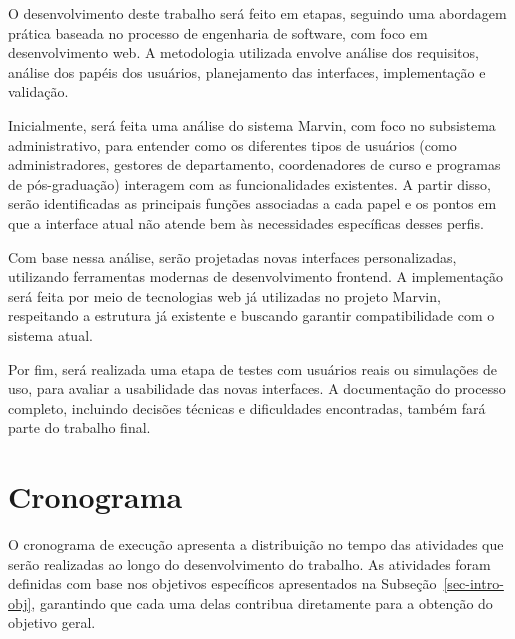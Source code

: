O desenvolvimento deste trabalho será feito em etapas, seguindo uma abordagem prática baseada no processo de engenharia de software, com foco em desenvolvimento web. A metodologia utilizada envolve análise dos requisitos, análise dos papéis dos usuários, planejamento das interfaces, implementação e validação.

Inicialmente, será feita uma análise do sistema Marvin, com foco no subsistema administrativo, para entender como os diferentes tipos de usuários (como administradores, gestores de departamento, coordenadores de curso e programas de pós-graduação) interagem com as funcionalidades existentes. A partir disso, serão identificadas as principais funções associadas a cada papel e os pontos em que a interface atual não atende bem às necessidades específicas desses perfis.

Com base nessa análise, serão projetadas novas interfaces personalizadas, utilizando ferramentas modernas de desenvolvimento frontend. A implementação será feita por meio de tecnologias web já utilizadas no projeto Marvin, respeitando a estrutura já existente e buscando garantir compatibilidade com o sistema atual.

Por fim, será realizada uma etapa de testes com usuários reais ou simulações de uso, para avaliar a usabilidade das novas interfaces. A documentação do processo completo, incluindo decisões técnicas e dificuldades encontradas, também fará parte do trabalho final.

\section{Cronograma}
\label{sec-intro-crono}

O cronograma de execução apresenta a distribuição no tempo das atividades que serão realizadas ao longo do desenvolvimento do trabalho. As atividades foram definidas com base nos objetivos específicos apresentados na Subseção~\ref{sec-intro-obj}, garantindo que cada uma delas contribua diretamente para a obtenção do objetivo geral.

